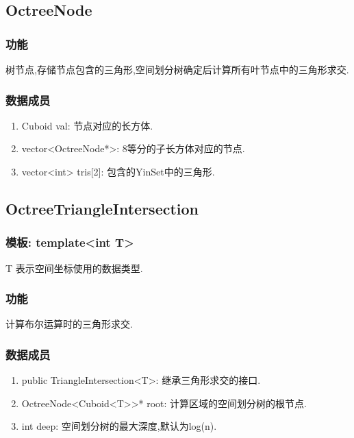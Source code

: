 \documentclass[a4paper]{book}
\numberwithin{equation}{chapter}
\theoremstyle{definition}
\begin{document}
\subsection{OctreeNode}

\subsubsection{功能}
树节点,存储节点包含的三角形,空间划分树确定后计算所有叶节点中的三角形求交.

\subsubsection{数据成员}
\begin{enumerate}
  \item Cuboid val: 节点对应的长方体.
  \item vector<OctreeNode*>: 8等分的子长方体对应的节点.
  \item vector<int> tris[2]: 包含的YinSet中的三角形.
\end{enumerate}

\subsection{OctreeTriangleIntersection}
\subsubsection{模板: template<int T>}
T 表示空间坐标使用的数据类型.

\subsubsection{功能}
计算布尔运算时的三角形求交.

\subsubsection{数据成员}
\begin{enumerate}
  \item public TriangleIntersection<T>: 继承三角形求交的接口.
  \item OctreeNode<Cuboid<T>>* root: 计算区域的空间划分树的根节点.
  \item int deep: 空间划分树的最大深度,默认为log(n).
\end{enumerate}
\end{document}
